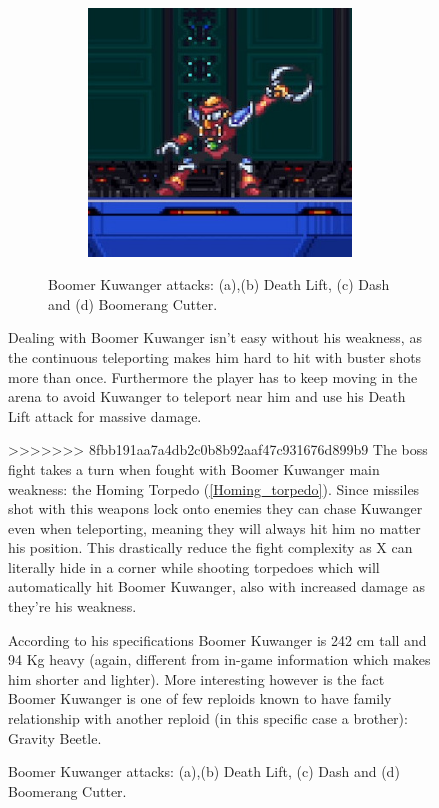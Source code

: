 \begin{figure}[htp]
\begin{figure}[htp]
\begin{subfigure}{0.4\linewidth}
		\caption{}
	\end{subfigure}
	\begin{subfigure}{0.4\linewidth}
		\centering
		\includegraphics[width=\linewidth]{figures/X1/Boomer_throw.jpg}
		\caption{}
	\end{subfigure}
	\caption{Boomer Kuwanger attacks: (a),(b) Death Lift, (c) Dash and (d) Boomerang Cutter.}
\end{figure}
Dealing with Boomer Kuwanger isn't easy without his weakness, as the continuous teleporting makes him hard to hit with buster shots more than once. Furthermore the player has to keep moving in the arena to avoid Kuwanger to teleport near him and use his Death Lift attack for massive damage.

>>>>>>> 8fbb191aa7a4db2c0b8b92aaf47c931676d899b9
The boss fight takes a turn when fought with Boomer Kuwanger main weakness: the Homing Torpedo (\ref{Homing_torpedo}). Since missiles shot with this weapons lock onto enemies they can chase Kuwanger even when teleporting, meaning they will always hit him no matter his position. This drastically reduce the fight complexity as X can literally hide in a corner while shooting torpedoes which will automatically hit Boomer Kuwanger, also with increased damage as they're his weakness.

According to his specifications Boomer Kuwanger is 242 cm tall and 94 Kg heavy (again, different from in-game information which makes him shorter and lighter). More interesting however is the fact Boomer Kuwanger is one of few reploids known to have family relationship with another reploid (in this specific case a brother): Gravity Beetle.%


\end{figure}
